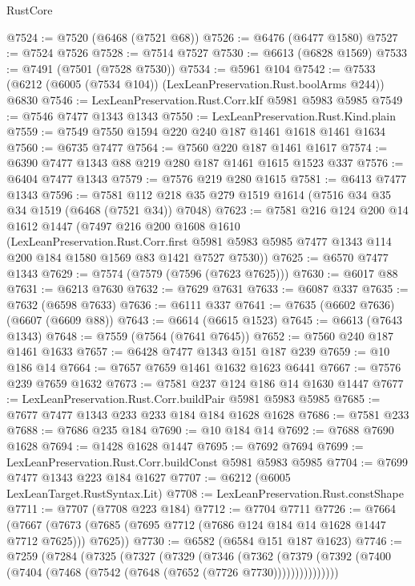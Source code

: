 \begin{lexlean}{RustCore}
\begin{coremodule}
@7524 := @7520 (@6468 (@7521 @68))
@7526 := @6476 (@6477 @1580)
@7527 := @7524 @7526
@7528 := @7514 @7527
@7530 := @6613 (@6828 @1569)
@7533 := @7491 (@7501 (@7528 @7530))
@7534 := @5961 @104
@7542 := @7533 (@6212 (@6005 (@7534 @104)) (LexLeanPreservation.Rust.boolArms @244)) @6830
@7546 := LexLeanPreservation.Rust.Corr.kIf @5981 @5983 @5985
@7549 := @7546 @7477 @1343 @1343
@7550 := LexLeanPreservation.Rust.Kind.plain
@7559 := @7549 @7550 @1594 @220 @240 @187 @1461 @1618 @1461 @1634
@7560 := @6735 @7477
@7564 := @7560 @220 @187 @1461 @1617
@7574 := @6390 @7477 @1343 @88 @219 @280 @187 @1461 @1615 @1523 @337
@7576 := @6404 @7477 @1343
@7579 := @7576 @219 @280 @1615
@7581 := @6413 @7477 @1343
@7596 := @7581 @112 @218 @35 @279 @1519 @1614 (@7516 @34 @35 @34 @1519 (@6468 (@7521 @34)) @7048)
@7623 := @7581
    @216
    @124
    @200
    @14
    @1612
    @1447
    (@7497
      @216
      @200
      @1608
      @1610
      (LexLeanPreservation.Rust.Corr.first
        @5981
        @5983
        @5985
        @7477
        @1343
        @114
        @200
        @184
        @1580
        @1569
        @83
        @1421
        @7527
        @7530))
@7625 := @6570 @7477 @1343
@7629 := @7574 (@7579 (@7596 (@7623 @7625)))
@7630 := @6017 @88
@7631 := @6213 @7630
@7632 := @7629 @7631
@7633 := @6087 @337
@7635 := @7632 (@6598 @7633)
@7636 := @6111 @337
@7641 := @7635 (@6602 @7636) (@6607 (@6609 @88))
@7643 := @6614 (@6615 @1523)
@7645 := @6613 (@7643 @1343)
@7648 := @7559 (@7564 (@7641 @7645))
@7652 := @7560 @240 @187 @1461 @1633
@7657 := @6428 @7477 @1343 @151 @187 @239
@7659 := @10 @186 @14
@7664 := @7657 @7659 @1461 @1632 @1623 @6441
@7667 := @7576 @239 @7659 @1632
@7673 := @7581 @237 @124 @186 @14 @1630 @1447
@7677 := LexLeanPreservation.Rust.Corr.buildPair @5981 @5983 @5985
@7685 := @7677 @7477 @1343 @233 @233 @184 @184 @1628 @1628
@7686 := @7581 @233
@7688 := @7686 @235 @184
@7690 := @10 @184 @14
@7692 := @7688 @7690 @1628
@7694 := @1428 @1628 @1447
@7695 := @7692 @7694
@7699 := LexLeanPreservation.Rust.Corr.buildConst @5981 @5983 @5985
@7704 := @7699 @7477 @1343 @223 @184 @1627
@7707 := @6212 (@6005 LexLeanTarget.RustSyntax.Lit)
@7708 := LexLeanPreservation.Rust.constShape
@7711 := @7707 (@7708 @223 @184)
@7712 := @7704 @7711
@7726 := @7664
    (@7667 (@7673 (@7685 (@7695 @7712 (@7686 @124 @184 @14 @1628 @1447 @7712 @7625))) @7625))
@7730 := @6582 (@6584 @151 @187 @1623)
@7746 := @7259
    (@7284
      (@7325
        (@7327
          (@7329
            (@7346
              (@7362
                (@7379 (@7392 (@7400 (@7404 (@7468 (@7542 (@7648 (@7652 (@7726 @7730)))))))))))))))

\end{coremodule}
\end{lexlean}
